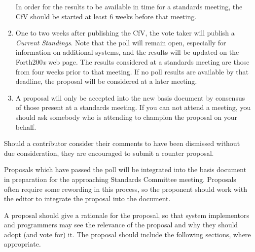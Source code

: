 \begin{enumerate}
	In order for the results to be available in time for a standards
	meeting, the CfV should be started at least 6 weeks before that
	meeting.

\item
	One to two weeks after publishing the CfV, the vote taker will
	publish a \emph{Current Standings}.  Note that the poll will remain
	open, especially for information on additional systems, and the
	results will be updated on the Forth200\emph{x} web page.  The
	results considered at a standards meeting are those from four weeks
	prior to that meeting.  If no poll results are available by that
	deadline, the proposal will be considered at a later meeting.

\item
	A proposal will only be accepted into the new basis document by
	consensus of those present at a standards meeting. If you can
	not attend a meeting, you should ask somebody who is attending
	to champion the proposal on your behalf.
\end{enumerate}

Should a contributor consider their comments to have been dismissed
without due consideration, they are encouraged to submit a counter
proposal.

Proposals which have passed the poll will be integrated into the basis
document in preparation for the approaching Standards Committee meeting.
Proposals often require some rewording in this process, so the proponent
should work with the editor to integrate the proposal into the document.

A proposal should give a rationale for the proposal, so that system
implementors and programmers may see the relevance of the proposal and
why they should adopt (and vote for) it. The proposal should include
the following sections, where appropriate.


